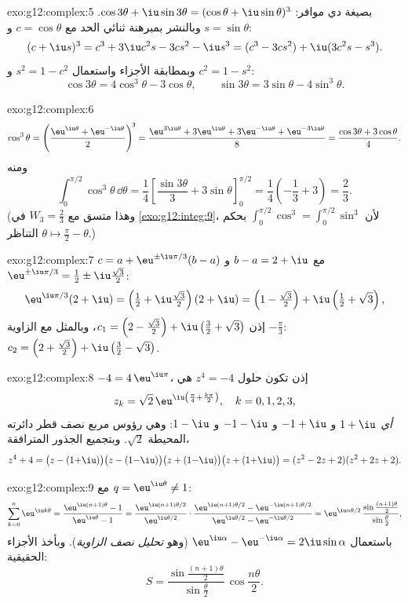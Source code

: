 \begin{solution}{exo:g12:complex:5}
بصيغة دي موافر: $\cos3\theta + \iu\sin3\theta = (\cos\theta + \iu\sin\theta)^3$.
وبالنشر بمبرهنة ثنائي الحد مع $c = \cos\theta$ و $s = \sin\theta$:
\[
(c + \iu s)^3 = c^3 + 3\iu c^2 s - 3 c s^2 - \iu s^3
= (c^3 - 3cs^2) + \iu(3c^2 s - s^3).
\]
وبمطابقة الأجزاء واستعمال $s^2 = 1 - c^2$ و $c^2 = 1 - s^2$:
\[
\cos3\theta = 4\cos^3\theta - 3\cos\theta,
\qquad
\sin3\theta = 3\sin\theta - 4\sin^3\theta .
\]
\end{solution}

\begin{solution}{exo:g12:complex:6}
\[
\cos^3\theta = \left(\frac{\eu^{\iu\theta} + \eu^{-\iu\theta}}{2}\right)^{\!3}
= \frac{\eu^{3\iu\theta} + 3\eu^{\iu\theta} + 3\eu^{-\iu\theta} + \eu^{-3\iu\theta}}{8}
= \frac{\cos3\theta + 3\cos\theta}{4}.
\]
ومنه
\[
\int_0^{\pi/2}\cos^3\theta\,\dd\theta
= \frac14\left[\frac{\sin3\theta}{3} + 3\sin\theta\right]_0^{\pi/2}
= \frac14\left(-\frac13 + 3\right) = \frac{2}{3}.
\]
(وهذا متسق مع $W_3 = \frac23$ في \cref{exo:g12:integ:9}، لأن
$\int_0^{\pi/2}\cos^3 = \int_0^{\pi/2}\sin^3$ بحكم التناظر
$\theta \mapsto \frac\pi2 - \theta$.)
\end{solution}

\begin{solution}{exo:g12:complex:7}
$c = a + \eu^{\pm\iu\pi/3}(b - a)$ مع $b - a = 2 + \iu$ و
$\eu^{\pm\iu\pi/3} = \frac12 \pm \iu\frac{\sqrt3}{2}$:
\[
\eu^{\iu\pi/3}(2+\iu) = \left(\tfrac12 + \iu\tfrac{\sqrt3}{2}\right)(2+\iu)
= \left(1 - \tfrac{\sqrt3}{2}\right) + \iu\left(\tfrac12 + \sqrt3\right),
\]
إذن $c_1 = \left(2 - \frac{\sqrt3}{2}\right) +
\iu\left(\frac32 + \sqrt3\right)$، وبالمثل مع الزاوية
$-\frac\pi3$:
$c_2 = \left(2 + \frac{\sqrt3}{2}\right) + \iu\left(\frac32 - \sqrt3\right)$.
\end{solution}

\begin{solution}{exo:g12:complex:8}
$-4 = 4\,\eu^{\iu\pi}$، إذن تكون حلول $z^4 = -4$ هي
\[
z_k = \sqrt2\,\eu^{\iu\left(\frac\pi4 + \frac{k\pi}{2}\right)},
\quad k = 0, 1, 2, 3,
\]
\emph{أي} $1 + \iu$ و $-1 + \iu$ و $-1 - \iu$ و $1 - \iu$: وهي رؤوس
مربع نصف قطر دائرته المحيطة $\sqrt 2$. وبتجميع الجذور المترافقة،
\[
z^4 + 4 = \bigl(z - (1{+}\iu)\bigr)\bigl(z - (1{-}\iu)\bigr)
\bigl(z + (1{-}\iu)\bigr)\bigl(z + (1{+}\iu)\bigr)
= (z^2 - 2z + 2)(z^2 + 2z + 2).
\]
\end{solution}

\begin{solution}{exo:g12:complex:9}
مع $q = \eu^{\iu\theta} \neq 1$:
\[
\sum_{k=0}^{n} \eu^{\iu k\theta} = \frac{\eu^{\iu(n+1)\theta} - 1}{\eu^{\iu\theta} - 1}
= \frac{\eu^{\iu(n+1)\theta/2}}{\eu^{\iu\theta/2}}
\cdot\frac{\eu^{\iu(n+1)\theta/2} - \eu^{-\iu(n+1)\theta/2}}{\eu^{\iu\theta/2} - \eu^{-\iu\theta/2}}
= \eu^{\iu n\theta/2}\,
\frac{\sin\frac{(n+1)\theta}{2}}{\sin\frac{\theta}{2}},
\]
باستعمال $\eu^{\iu\alpha} - \eu^{-\iu\alpha} = 2\iu\sin\alpha$ (وهو
\emph{تحليل نصف الزاوية}). وبأخذ الأجزاء الحقيقية:
\[
S = \frac{\sin\frac{(n+1)\theta}{2}}{\sin\frac{\theta}{2}}\,
\cos\frac{n\theta}{2}.
\]
\end{solution}

